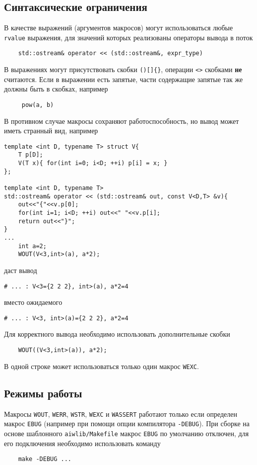 \subsection{Синтаксические ограничения}
В качестве выражений (аргументов макросов) могут использоваться любые \verb'rvalue' выражения,
для значений которых реализованы операторы
вывода в поток
\begin{verbatim}
    std::ostream& operator << (std::ostream&, expr_type)
\end{verbatim}

В выражениях могут присутствовать скобки \verb'()[]{}', операции \verb'<>' скобками {\bf не} считаются.
Если в выражении есть запятые, части содержащие запятые так же должны быть в скобках, например
\begin{verbatim}
     pow(a, b)   
\end{verbatim}
В противном случае макросы сохраняют работоспособность, но вывод может иметь странный вид, например
\begin{verbatim}
template <int D, typename T> struct V{
	T p[D];
	V(T x){ for(int i=0; i<D; ++i) p[i] = x; }
};

template <int D, typename T> 
std::ostream& operator << (std::ostream& out, const V<D,T> &v){
	out<<"{"<<v.p[0];
	for(int i=1; i<D; ++i) out<<" "<<v.p[i];
	return out<<"}";
}
...
	int a=2;
	WOUT(V<3,int>(a), a*2);
\end{verbatim}
даст вывод
\begin{verbatim}
# ... : V<3={2 2 2}, int>(a), a*2=4
\end{verbatim}
вместо ожидаемого
\begin{verbatim}
# ... : V<3, int>(a)={2 2 2}, a*2=4
\end{verbatim}
Для корректного вывода необходимо использовать дополнительные скобки
\begin{verbatim}
	WOUT((V<3,int>(a)), a*2);
\end{verbatim}

В одной строке может использоваться только один макрос \verb'WEXC'.

\subsection{Режимы работы}
Макросы \verb'WOUT', \verb'WERR', \verb'WSTR', \verb'WEXC' и \verb'WASSERT' работают только если определен макрос \verb'EBUG'
(например при помощи опции компилятора \verb'-DEBUG'). При сборке на основе шаблонного \verb'aiwlib/Makefile'
макрос \verb'EBUG' по умолчанию отключен, для его подключения необходимо использовать команду
\begin{verbatim}
    make -DEBUG ...
\end{verbatim}

